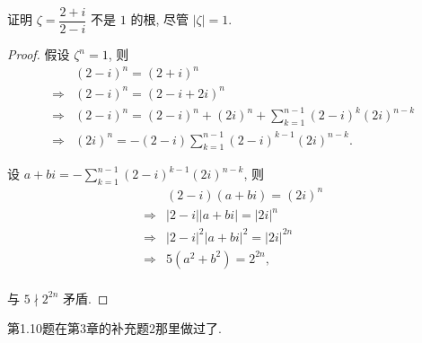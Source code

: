 \documentclass[UTF8]{ctexart}
\begin{document}
\begin{exercise}[1.8]
    证明 $\zeta=\dfrac{2+i}{2-i}$ 不是 $1$ 的根, 尽管 $|\zeta|=1$.
\end{exercise}
\begin{proof}
    假设 $\zeta^n=1$, 则
    \begin{align*}
        & (2-i)^n=(2+i)^n \\
        \Rightarrow & (2-i)^n=(2-i+2i)^n \\
        \Rightarrow & (2-i)^n=(2-i)^n+(2i)^n+\sum\limits_{k=1}^{n-1}(2-i)^k(2i)^{n-k} \\
        \Rightarrow & (2i)^n=-(2-i)\sum\limits_{k=1}^{n-1}(2-i)^{k-1}(2i)^{n-k}.
    \end{align*}

    设 $a+bi=-\sum\limits_{k=1}^{n-1}(2-i)^{k-1}(2i)^{n-k}$, 则
    \begin{align*}
        & (2-i)(a+bi)=(2i)^n \\
        \Rightarrow & |2-i||a+bi|=|2i|^n \\
        \Rightarrow & |2-i|^2|a+bi|^2=|2i|^{2n} \\
        \Rightarrow & 5(a^2+b^2)=2^{2n}, \\
    \end{align*}

    与 $5\nmid2^{2n}$ 矛盾.
\end{proof}
第1.10题在第3章的补充题2那里做过了.
\end{document}
